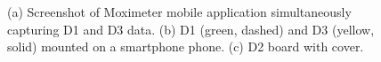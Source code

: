 \begin{figure}
	\begin{center}
	\end{center}
	\caption{(a) Screenshot of Moximeter mobile application simultaneously capturing D1 and D3 data. (b) D1 (green, dashed) and D3 (yellow, solid) mounted on a smartphone phone. (c) D2 board with cover.} 
	\label{fig:designs}
\end{figure} 


